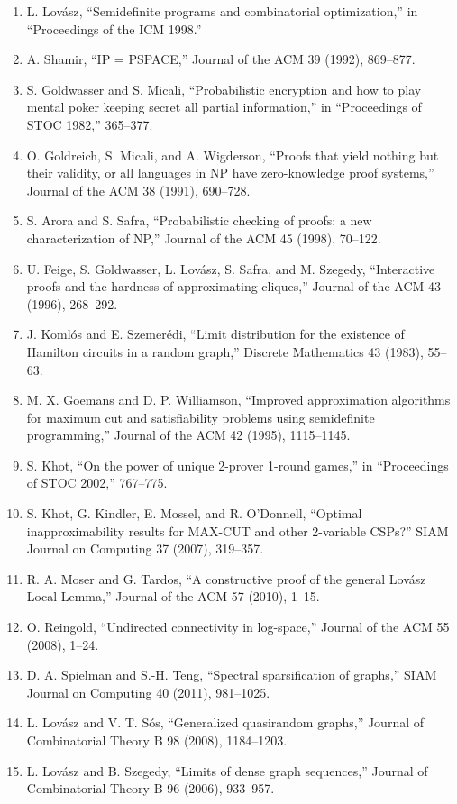 \begin{enumerate}
\item L. Lov\'asz, ``Semidefinite programs and combinatorial optimization,'' in ``Proceedings of the ICM 1998.''
\item A. Shamir, ``IP = PSPACE,'' Journal of the ACM 39 (1992), 869--877.
\item S. Goldwasser and S. Micali, ``Probabilistic encryption and how to play mental poker keeping secret all partial information,'' in ``Proceedings of STOC 1982,'' 365--377.
\item O. Goldreich, S. Micali, and A. Wigderson, ``Proofs that yield nothing but their validity, or all languages in NP have zero-knowledge proof systems,'' Journal of the ACM 38 (1991), 690--728.
\item S. Arora and S. Safra, ``Probabilistic checking of proofs: a new characterization of NP,'' Journal of the ACM 45 (1998), 70--122.
\item U. Feige, S. Goldwasser, L. Lov\'asz, S. Safra, and M. Szegedy, ``Interactive proofs and the hardness of approximating cliques,'' Journal of the ACM 43 (1996), 268--292.
\item J. Koml\'os and E. Szemer\'edi, ``Limit distribution for the existence of Hamilton circuits in a random graph,'' Discrete Mathematics 43 (1983), 55--63.
\item M. X. Goemans and D. P. Williamson, ``Improved approximation algorithms for maximum cut and satisfiability problems using semidefinite programming,'' Journal of the ACM 42 (1995), 1115--1145.
\item S. Khot, ``On the power of unique 2-prover 1-round games,'' in ``Proceedings of STOC 2002,'' 767--775.
\item S. Khot, G. Kindler, E. Mossel, and R. O'Donnell, ``Optimal inapproximability results for MAX-CUT and other 2-variable CSPs?'' SIAM Journal on Computing 37 (2007), 319--357.
\item R. A. Moser and G. Tardos, ``A constructive proof of the general Lov\'asz Local Lemma,'' Journal of the ACM 57 (2010), 1--15.
\item O. Reingold, ``Undirected connectivity in log-space,'' Journal of the ACM 55 (2008), 1--24.
\item D. A. Spielman and S.-H. Teng, ``Spectral sparsification of graphs,'' SIAM Journal on Computing 40 (2011), 981--1025.
\item L. Lov\'asz and V. T. S\'os, ``Generalized quasirandom graphs,'' Journal of Combinatorial Theory B 98 (2008), 1184--1203.
\item L. Lov\'asz and B. Szegedy, ``Limits of dense graph sequences,'' Journal of Combinatorial Theory B 96 (2006), 933--957.
\end{enumerate}
